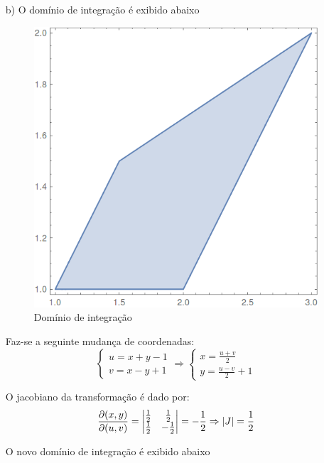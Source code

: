 \documentclass[12pt,a4paper]{article}
\begin{document}
\begin{itemize}
\item[b)] O domínio de integração é exibido abaixo

\begin{figure}[H]
	\centering
	\includegraphics[scale=0.25]{Fig1b-1.png}  
	\caption{Domínio de integração}
	\label{fig:figura1b1}
\end{figure}    
Faz-se a seguinte mudança de coordenadas:
$$\begin{cases}
u = x+y-1\\
v = x-y+1
\end{cases}
\Rightarrow
\begin{cases}
x = \frac{u+v}{2}\\
y = \frac{u-v}{2}+1
\end{cases}
$$

O jacobiano da transformação é dado por:
$$
\frac{\partial(x,y)}{\partial(u,v)}=
\begin{vmatrix}
\frac{1}{2} & \frac{1}{2} \\
\frac{1}{2} & -\frac{1}{2}\\
\end{vmatrix}
=-\frac{1}{2} \Rightarrow |J|=\frac{1}{2}\\
$$  

O novo domínio de integração é exibido abaixo


\end{itemize}
\end{document}
